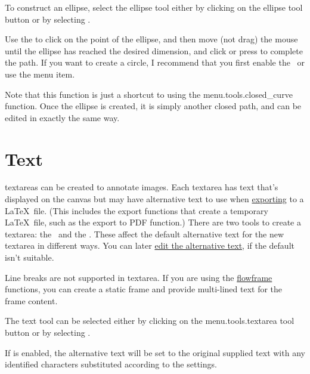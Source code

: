 
To construct an ellipse, select the ellipse tool either by clicking
on the ellipse tool button or by selecting
.

Use the  to click on the
 point of the ellipse, and then move (not drag) the mouse
until the ellipse has reached the desired dimension, and \gls{click}
or press  to complete the \gls{path}. If you want
to create a circle, I recommend that you first enable the \gridlock\ or use the
 menu item.

Note that this function is just a shortcut to using the
\gls{menu.tools.closed_curve} function. Once the ellipse is
created, it is simply another closed \gls{path}, and can be edited in
exactly the same way.


\section{Text}\label{sec:newtext}

\Glspl{textarea} can be created to annotate images. Each
\gls*{textarea} has text that's displayed on the \gls{canvas} but
may have alternative text to use when
\hyperref[sec:exportimage]{exporting} to a \LaTeX\ file. (This includes
the export functions that create a temporary \LaTeX\ file, such as
the export to PDF function.) There are two tools to create a
\gls*{textarea}: the \texttool\ and the \mathstool. These
affect the default alternative text for the new \gls*{textarea} in
different ways. You can later \hyperref[sec:edittext]{edit the
alternative text}, if the default isn't suitable.

Line breaks are not supported in \gls{textarea}. If you are using
the \hyperref[sec:flowframe]{flowframe} functions, you can create a
static frame and provide multi-lined text for the frame content.


The text tool can be selected either by clicking on the
\gls{menu.tools.textarea} tool button or by selecting .

If  is enabled, the alternative text will be set
to the original supplied text with any identified characters
substituted according to the  settings.

